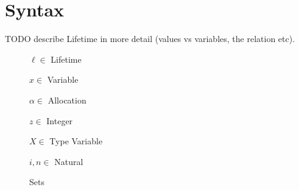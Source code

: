 \documentclass{article}
\begin{document}
\newcommand{\imm}{\textrm{imm}}
\newcommand{\mut}{\textrm{mut}}
\newcommand{\zah}{\textrm{int}}
\newcommand{\pay}{\textrm{pay}}
\newcommand{\unroll}{\textrm{unroll}}
\newcommand{\roll}{\textrm{roll}}
\newcommand{\void}{\textrm{void}}
\newcommand{\slot}{\textrm{slot}}
\newcommand{\uninit}{\textrm{uninit}}
\newcommand{\hole}{\textrm{hole}}
\newcommand{\init}{\textrm{init}}

\newcommand{\Own}[1]{\sim {#1}}
\newcommand{\Ref}[3]{\&\ {#1}\ {#2}\ {#3}}
\newcommand{\Var}[2]{\langle {#1} \rangle_{#2}}
\newcommand{\Rec}[2]{[ {#1} ]_{#2}}
\newcommand{\Fix}[2]{\mu {#1}.{#2}}

\newcommand{\Base}{\cdot}
\newcommand{\Deref}[1]{*\ {#1}}
\newcommand{\Proj}[3]{{#1}\cdot_{#2} {#3}}
\newcommand{\Pay}[1]{\pay\ {#1}}
\newcommand{\Unroll}[2]{\unroll\ [{#1}]\ {#2}}

\newcommand{\OwnVal}[2]{\Own{{#1}\ {#2}}}
\newcommand{\Slot}[1]{\slot\ {#1}}
\newcommand{\VarVal}[3]{\langle {#1} : {#2} \rangle_{#3}}
\newcommand{\Roll}[2]{\roll\ [{#1}]\ {#2}}

\newcommand{\RefVal}[2]{\&\ {#1}\ {#2}}
\newcommand{\Hole}[1]{\hole\ {#1}}

\newcommand{\Subst}[3]{[{#1} \mapsto {#2}]{#3}}

\newcommand{\Type}[3]{{#1} \vdash {#2} : {#3}}
\newcommand{\RTType}[4]{\Type{{#1} ;{#2}}{{#3}}{{#4}}}
\newcommand{\ARType}[5]{\RTType{{#1}}{{#2}}{{#3}\ {#4}}{{#5}}}
\newcommand{\Read}[4]{\textsc{read}({#1},{#2},{#3},{#4})}
\newcommand{\HWF}[3]{\vdash {#1} : {#2} ; {#3}}
\newcommand{\YWF}[2]{\vdash {#1} : {#2}}
\newcommand{\Shallow}[4]{\textsc{shallow}({#1},{#2},{#3},{#4})}

\section{Syntax}

TODO describe Lifetime in more detail (values vs variables, the relation etc).

\begin{figure}[H]
  $\ell \in $ Lifetime

  $x \in $ Variable

  $\alpha \in $ Allocation

  $z \in $ Integer

  $X \in $ Type Variable

  $i,n \in $ Natural
  \caption{Sets}
\end{figure}
\end{document}

